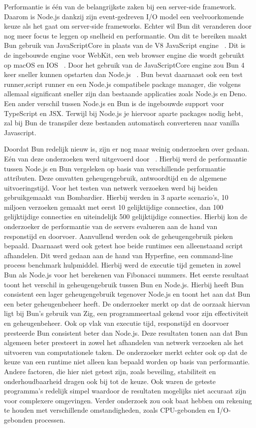 Performantie is één van de belangrijkste zaken bij een server-side framework. Daarom is Node.js dankzij zijn 
event-gedreven I/O model een veelvoorkomende keuze als het gaat om server-side frameworks. 
Echter wil Bun dit veranderen door nog meer focus te leggen op snelheid en performantie. 
Om dit te bereiken maakt Bun gebruik van JavaScriptCore in plaats van de V8 JavaScript engine ~\autocite{McDonnel2023}.
Dit is de ingebouwde engine voor WebKit, een web browser engine die wordt gebruikt op macOS en IOS ~\autocite{Pizlo2020}.
Door het gebruik van de JavaScriptCore engine zou Bun 4 keer sneller kunnen opstarten dan Node.js ~\autocite{McDonnel2023}.
Bun bevat daarnaast ook een test runner,script runner en een Node.js compatibele package manager, die volgens ~\textcite{McDonnel2023} 
allemaal significant sneller zijn dan bestaande applicaties zoals Node.js en Deno.
Een ander verschil tussen Node.js en Bun is de ingebouwde support voor TypeScript en JSX. 
Terwijl bij Node.js je hiervoor aparte packages nodig hebt, 
zal bij Bun de transpiler deze bestanden automatisch converteren naar vanilla Javascript.

Doordat Bun redelijk nieuw is, zijn er nog maar weinig onderzoeken over gedaan.
Eén van deze onderzoeken werd uitgevoerd door ~\textcite{Feroj2023}.
Hierbij werd de performantie tussen Node.js en Bun vergeleken op basis van verschillende performantie attributen. 
Deze omvatten geheugengebruik, antwoordtijd en de algemene uitvoeringstijd. 
Voor het testen van netwerk verzoeken werd bij beiden gebruikgemaakt van Bombardier. Hierbij werden in 3 aparte scenario's, 
10 miljoen verzoeken gemaakt met eerst 10 gelijktijdige connecties, dan 100 gelijktijdige connecties en
uiteindelijk 500 gelijktijdige connecties. Hierbij kon de onderzoeker de performantie van de servers evalueren 
aan de hand van responstijd en doorvoer. Aanvullend werden ook de geheugengebruik pieken bepaald.
Daarnaast werd ook getest hoe beide runtimes een alleenstaand script afhandelen. 
Dit werd gedaan aan de hand van Hyperfine, een command-line process benchmark hulpmiddel. 
Hierbij werd de executie tijd gemeten in zowel Bun als Node.js voor het berekenen van Fibonacci nummers.
Het eerste resultaat toont het verschil in geheugengebruik tussen Bun en Node.js. 
Hierbij heeft Bun consistent een lager geheugengebruik tegenover Node.js en toont het aan dat Bun een beter geheugenbeheer heeft.
De onderzoeker merkt op dat de oorzaak hiervan ligt bij Bun's gebruik van Zig, 
een programmeertaal gekend voor zijn effectiviteit en geheugenbeheer. 
Ook op vlak van executie tijd, responstijd en doorvoer presteerde Bun consistent beter dan Node.js. 
Deze resultaten tonen aan dat Bun algemeen beter presteert in zowel het afhandelen van netwerk verzoeken 
als het uitvoeren van computationele taken.
De onderzoeker merkt echter ook op dat de keuze van een runtime niet alleen kan bepaald worden op basis van performantie. 
Andere factoren, die hier niet getest zijn, zoals beveiling, stabiliteit en onderhoudbaarheid dragen ook bij tot de keuze. 
Ook waren de geteste programma's redelijk simpel waardoor de resultaten mogelijks niet accuraat zijn voor complexere omgevingen.
Verder onderzoek zou ook baat hebben om rekening te houden met verschillende omstandigheden, 
zoals CPU-gebonden en I/O-gebonden processen.

